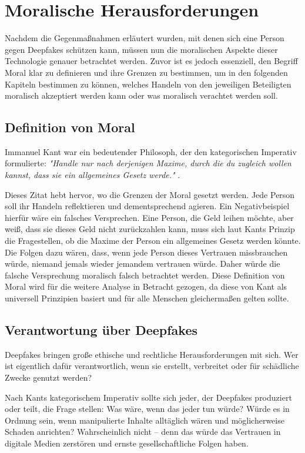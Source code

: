 \documentclass[a4paper,12pt]{article}
\begin{document}
\newpage

\section{Moralische Herausforderungen}
Nachdem die Gegenmaßnahmen erläutert wurden, mit denen sich eine Person gegen Deepfakes schützen kann, müssen nun die moralischen Aspekte dieser Technologie genauer betrachtet werden.
Zuvor ist es jedoch essenziell, den Begriff Moral klar zu definieren und ihre Grenzen zu bestimmen, um in den folgenden Kapiteln bestimmen zu können, welches Handeln von den jeweiligen Beteiligten  moralisch akzeptiert werden kann oder was moralisch verachtet werden soll.

\subsection{Definition von Moral}
Immanuel Kant war ein bedeutender Philosoph, der den kategorischen Imperativ formulierte:
\textit{"Handle nur nach derjenigen Maxime, durch die du zugleich wollen kannst, dass sie ein allgemeines Gesetz werde."} \cite{KantMetaphysik}.

Dieses Zitat hebt hervor, wo die Grenzen der Moral gesetzt werden. Jede Person soll ihr Handeln reflektieren und dementsprechend agieren.
Ein Negativbeispiel hierfür wäre ein falsches Versprechen. Eine Person, die Geld leihen möchte, aber weiß, dass sie dieses Geld nicht zurückzahlen kann, muss sich laut Kants Prinzip die Fragestellen, ob die Maxime der Person ein allgemeines Gesetz werden könnte. Die Folgen dazu wären, dass, wenn jede Person dieses Vertrauen missbrauchen würde, niemand jemals wieder jemandem vertrauen würde. Daher würde die falsche Versprechung moralisch falsch betrachtet werden. \cite{KantMetaphysik}
Diese Definition von Moral wird für die weitere Analyse in Betracht gezogen, da diese von Kant als universell Prinzipien basiert und für alle Menschen gleichermaßen gelten sollte.

\subsection{Verantwortung über Deepfakes}
Deepfakes bringen große ethische und rechtliche Herausforderungen mit sich. Wer ist eigentlich dafür verantwortlich, wenn sie erstellt, verbreitet oder für schädliche Zwecke genutzt werden?

Nach Kants kategorischem Imperativ sollte sich jeder, der Deepfakes produziert oder teilt, die Frage stellen: Was wäre, wenn das jeder tun würde? Würde es in Ordnung sein, wenn manipulierte Inhalte alltäglich wären und möglicherweise Schaden anrichten? Wahrscheinlich nicht – denn das würde das Vertrauen in digitale Medien zerstören und ernste gesellschaftliche Folgen haben.
\end{document}
